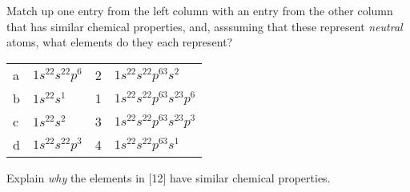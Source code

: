 \documentclass[addpoints, 12pt]{exam}
\begin{document}
\begin{questions}

\question[5] Match up one entry from the left column with an entry from the other
  column that has similar chemical properties, and, asssuming that
  these represent \emph{neutral} atoms, what elements do they each represent?

\begin{tabular}{|l|l|l|l|}
a& $1s^22s^22p^6$ & 2& $1s^22s^22p^63s^2$ \\
b& $1s^22s^1$ & 1& $1s^22s^22p^63s^23p^6$ \\
c& $1s^22s^2$ & 3& $1s^22s^22p^63s^23p^3$ \\
d& $1s^22s^22p^3$ & 4&$1s^22s^22p^63s^1$  
\end{tabular}

\question[5]  Explain \emph{why} the elements in [12] have similar
chemical properties.




\end{questions}
\end{document}

